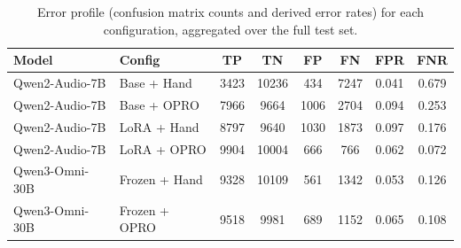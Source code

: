 \begin{table}[t]
\centering
\caption{Error profile (confusion matrix counts and derived error rates) for each configuration, aggregated over the full test set.}
\label{tab:error-counts}
\footnotesize
\setlength{\tabcolsep}{4pt}
\renewcommand{\arraystretch}{1.12}
\begin{tabular}{llcccccc}
\toprule
\textbf{Model} & \textbf{Config} & \textbf{TP} & \textbf{TN} & \textbf{FP} & \textbf{FN} & \textbf{FPR} & \textbf{FNR} \\
\midrule
Qwen2-Audio-7B & Base + Hand & 3423 & 10236 & 434 & 7247 & 0.041 & 0.679 \\
Qwen2-Audio-7B & Base + OPRO & 7966 & 9664 & 1006 & 2704 & 0.094 & 0.253 \\
Qwen2-Audio-7B & LoRA + Hand & 8797 & 9640 & 1030 & 1873 & 0.097 & 0.176 \\
Qwen2-Audio-7B & LoRA + OPRO & 9904 & 10004 & 666 & 766 & 0.062 & 0.072 \\
Qwen3-Omni-30B & Frozen + Hand & 9328 & 10109 & 561 & 1342 & 0.053 & 0.126 \\
Qwen3-Omni-30B & Frozen + OPRO & 9518 & 9981 & 689 & 1152 & 0.065 & 0.108 \\
\bottomrule
\end{tabular}
\end{table}